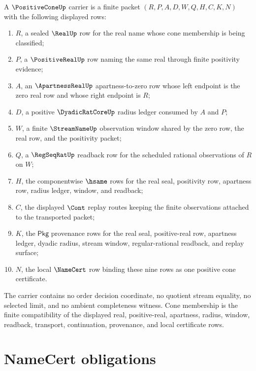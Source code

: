 \begin{definition}
\label{def:positive-cone-carrier}
A $\PositiveConeUp$ carrier is a finite packet
$(R,P,A,D,W,Q,H,C,K,N)$ with the following displayed rows:
\begin{enumerate}
\item $R$, a sealed $\RealUp$ row for the real name whose cone membership is
being classified;
\item $P$, a $\PositiveRealUp$ row naming the same real through finite
positivity evidence;
\item $A$, an $\ApartnessRealUp$ apartness-to-zero row whose left endpoint is
the zero real row and whose right endpoint is $R$;
\item $D$, a positive $\DyadicRatCoreUp$ radius ledger consumed by $A$ and $P$;
\item $W$, a finite $\StreamNameUp$ observation window shared by the zero row,
the real row, and the positivity packet;
\item $Q$, a $\RegSeqRatUp$ readback row for the scheduled rational
observations of $R$ on $W$;
\item $H$, the componentwise $\hsame$ rows for the real seal, positivity row,
apartness row, radius ledger, window, and readback;
\item $C$, the displayed $\Cont$ replay routes keeping the finite observations
attached to the transported packet;
\item $K$, the $\mathsf{Pkg}$ provenance rows for the real seal, positive-real
row, apartness ledger, dyadic radius, stream window, regular-rational
readback, and replay surface;
\item $N$, the local $\NameCert$ row binding these nine rows as one positive
cone certificate.
\end{enumerate}
The carrier contains no order decision coordinate, no quotient stream equality,
no selected limit, and no ambient completeness witness. Cone membership is the
finite compatibility of the displayed real, positive-real, apartness, radius,
window, readback, transport, continuation, provenance, and local certificate
rows.
\end{definition}

\section{NameCert obligations}
\label{sec:positive-cone-namecert-obligations}

